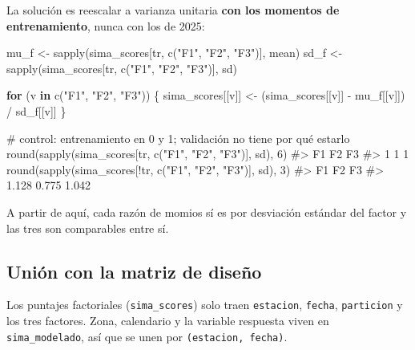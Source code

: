 \documentclass[
  spanish,
  letterpaper,
  DIV=11,
  numbers=noendperiod]{scrartcl}
\newenvironment{Shaded}{\begin{snugshade}}{\end{snugshade}}
\newcommand{\CommentTok}[1]{\textcolor[rgb]{0.37,0.37,0.37}{#1}}
\newcommand{\ControlFlowTok}[1]{\textcolor[rgb]{0.00,0.23,0.31}{\textbf{#1}}}
\newcommand{\DecValTok}[1]{\textcolor[rgb]{0.68,0.00,0.00}{#1}}
\newcommand{\FunctionTok}[1]{\textcolor[rgb]{0.28,0.35,0.67}{#1}}
\newcommand{\NormalTok}[1]{\textcolor[rgb]{0.00,0.23,0.31}{#1}}
\newcommand{\OtherTok}[1]{\textcolor[rgb]{0.00,0.23,0.31}{#1}}
\newcommand{\SpecialCharTok}[1]{\textcolor[rgb]{0.37,0.37,0.37}{#1}}
\newcommand{\StringTok}[1]{\textcolor[rgb]{0.13,0.47,0.30}{#1}}
\begin{document}
La solución es reescalar a varianza unitaria \textbf{con los momentos de
entrenamiento}, nunca con los de 2025:

\begin{Shaded}
\begin{Highlighting}[]
\NormalTok{mu\_f }\OtherTok{\textless{}{-}} \FunctionTok{sapply}\NormalTok{(sima\_scores[tr, }\FunctionTok{c}\NormalTok{(}\StringTok{"F1"}\NormalTok{, }\StringTok{"F2"}\NormalTok{, }\StringTok{"F3"}\NormalTok{)], mean)}
\NormalTok{sd\_f }\OtherTok{\textless{}{-}} \FunctionTok{sapply}\NormalTok{(sima\_scores[tr, }\FunctionTok{c}\NormalTok{(}\StringTok{"F1"}\NormalTok{, }\StringTok{"F2"}\NormalTok{, }\StringTok{"F3"}\NormalTok{)], sd)}

\ControlFlowTok{for}\NormalTok{ (v }\ControlFlowTok{in} \FunctionTok{c}\NormalTok{(}\StringTok{"F1"}\NormalTok{, }\StringTok{"F2"}\NormalTok{, }\StringTok{"F3"}\NormalTok{)) \{}
\NormalTok{    sima\_scores[[v]] }\OtherTok{\textless{}{-}}\NormalTok{ (sima\_scores[[v]] }\SpecialCharTok{{-}}\NormalTok{ mu\_f[[v]]) }\SpecialCharTok{/}\NormalTok{ sd\_f[[v]]}
\NormalTok{\}}

\CommentTok{\# control: entrenamiento en 0 y 1; validación no tiene por qué estarlo}
\FunctionTok{round}\NormalTok{(}\FunctionTok{sapply}\NormalTok{(sima\_scores[tr, }\FunctionTok{c}\NormalTok{(}\StringTok{"F1"}\NormalTok{, }\StringTok{"F2"}\NormalTok{, }\StringTok{"F3"}\NormalTok{)], sd), }\DecValTok{6}\NormalTok{)}
\CommentTok{\#\textgreater{} F1 F2 F3 }
\CommentTok{\#\textgreater{}  1  1  1}
\FunctionTok{round}\NormalTok{(}\FunctionTok{sapply}\NormalTok{(sima\_scores[}\SpecialCharTok{!}\NormalTok{tr, }\FunctionTok{c}\NormalTok{(}\StringTok{"F1"}\NormalTok{, }\StringTok{"F2"}\NormalTok{, }\StringTok{"F3"}\NormalTok{)], sd), }\DecValTok{3}\NormalTok{)}
\CommentTok{\#\textgreater{}    F1    F2    F3 }
\CommentTok{\#\textgreater{} 1.128 0.775 1.042}
\end{Highlighting}
\end{Shaded}

A partir de aquí, cada razón de momios sí es por desviación estándar del
factor y las tres son comparables entre sí.

\subsection{Unión con la matriz de
diseño}\label{uniuxf3n-con-la-matriz-de-diseuxf1o}

Los puntajes factoriales (\texttt{sima\_scores}) solo traen
\texttt{estacion}, \texttt{fecha}, \texttt{particion} y los tres
factores. Zona, calendario y la variable respuesta viven en
\texttt{sima\_modelado}, así que se unen por
\texttt{(estacion,\ fecha)}.
\end{document}
